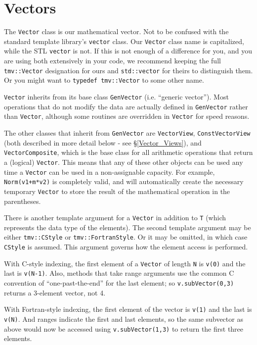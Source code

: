 \documentclass[twoside,letterpaper,11pt]{article}
\renewcommand{\tt}[1]{{\lstinline {#1}}}
\begin{document}
\newpage
\section{Vectors}
\label{Vector}

The \tt{Vector} class is our mathematical vector.  Not to be confused with
the standard template library's \tt{vector} class.  
Our \tt{Vector} class name is capitalized, while the STL \tt{vector} is not.
If this is not enough of a difference for you, and you are using both extensively in your code,
we recommend keeping the full \tt{tmv::Vector} designation for ours and \tt{std::vector}
for theirs to distinguish them.  Or you might want to \tt{typedef tmv::Vector} to some other name.

\tt{Vector} inherits from its base class \tt{GenVector} (i.e. ``generic vector'').
Most operations that do not 
modify the data are actually defined in \tt{GenVector} rather than \tt{Vector}, although
some routines are overridden in \tt{Vector} for speed reasons.  

The other classes that inherit from \tt{GenVector} are \tt{VectorView}, 
\tt{ConstVectorView} (both described in more detail below - see \S\ref{Vector_Views}), and
\tt{VectorComposite}, which is the base class for all arithmetic operations that
return a (logical) \tt{Vector}.  This means that any of these other objects can be used
any time a \tt{Vector} can be used in a non-assignable capacity.  For example,
\tt{Norm(v1+m*v2)} is completely valid, and will automatically create the necessary
temporary \tt{Vector} to store the result of the mathematical operation in the parentheses.

There is another template argument for a \tt{Vector} in addition to \tt{T} (which
represents the data type of the elements).  The second template argument
may be either \tt{tmv::CStyle} or \tt{tmv::FortranStyle}.  Or it may be omitted,
in which case \tt{CStyle} is assumed.  This argument governs how the element
access is performed.

With C-style indexing, the first element of a \tt{Vector} of length \tt{N} is 
\tt{v(0)} and the last is \tt{v(N-1)}.  Also, methods that take range arguments
use the common C convention of ``one-past-the-end'' for the last element;
so \tt{v.subVector(0,3)} returns a 3-element vector, not 4.

With Fortran-style indexing, the first element of the vector is \tt{v(1)} and the 
last is \tt{v(N)}.  And ranges indicate the first and last elements, so the same
subvector as above would now be accessed using \tt{v.subVector(1,3)} to return
the first three elements.
\end{document}
